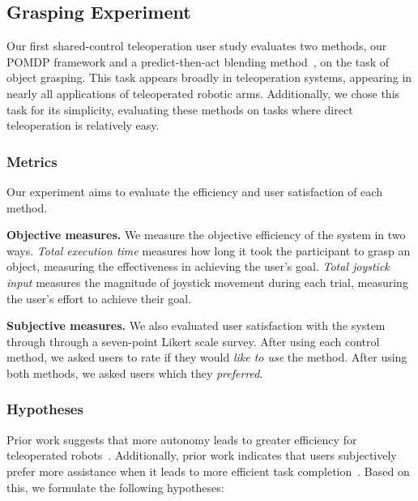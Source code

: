 \subsection{Grasping Experiment}
\label{sec:experiment_rss_2015}

Our first shared-control teleoperation user study evaluates two methods, our POMDP framework and a predict-then-act blending method~\citep{dragan_2013_assistive}, on the task of object grasping. This task appears broadly in teleoperation systems, appearing in nearly all applications of teleoperated robotic arms. Additionally, we chose this task for its simplicity, evaluating these methods on tasks where direct teleoperation is relatively easy.


\subsubsection{Metrics}
\label{sec:experiment_rss_2015_metrics}

Our experiment aims to evaluate the efficiency and user satisfaction of each method.

\textbf{Objective measures.} We measure the objective efficiency of the system in two ways. \emph{Total execution time} measures how long it took the participant to grasp an object, measuring the effectiveness in achieving the user's goal. \emph{Total joystick input} measures the magnitude of joystick movement during each trial, measuring the user's effort to achieve their goal.

\textbf{Subjective measures.} We also evaluated user satisfaction with the system through through a seven-point Likert scale survey. After using each control method, we asked users to rate if they would \emph{like to use} the method. After using both methods, we asked users which they \emph{preferred}.

\subsubsection{Hypotheses}
\label{sec:hypoths_rss_2015}

Prior work suggests that more autonomy leads to greater efficiency for teleoperated robots~\citep{you_2011, leeper_2012, dragan_2013_assistive, hauser_2013, javdani_2015_rss}. Additionally, prior work indicates that users subjectively prefer more assistance when it leads to more efficient task completion~\citep{you_2011, dragan_2013_assistive}. Based on this, we formulate the following hypotheses:
\newhypothset

